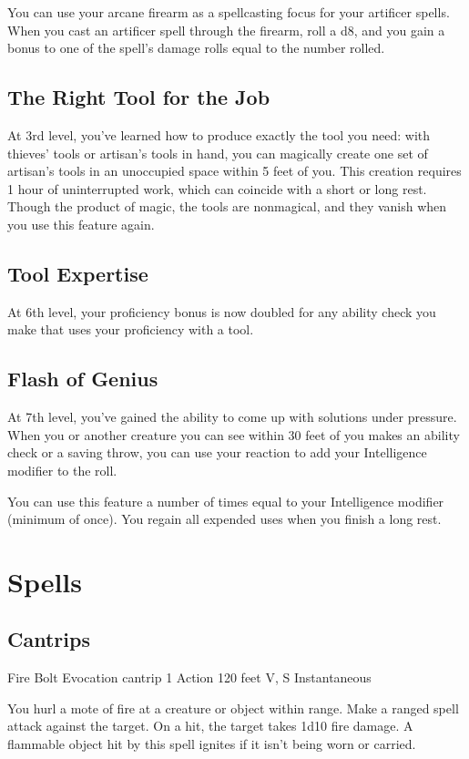 {You can use your arcane firearm as a spellcasting focus for your artificer spells. When you cast an artificer spell through the firearm, roll a d8, and you gain a bonus to one of the spell's damage rolls equal to the number rolled.

\subsection*{The Right Tool for the Job}
At 3rd level, you've learned how to produce exactly the tool you need: with thieves' tools or artisan's tools in hand, you can magically create one set of artisan's tools in an unoccupied space within 5 feet of you. This creation requires 1 hour of uninterrupted work, which can coincide with a short or long rest. Though the product of magic, the tools are nonmagical, and they vanish when you use this feature again.

\subsection*{Tool Expertise}
At 6th level, your proficiency bonus is now doubled for any ability check you make that uses your proficiency with a tool.

\subsection*{Flash of Genius}
At 7th level, you've gained the ability to come up with solutions under pressure. When you or another creature you can see within 30 feet of you makes an ability check or a saving throw, you can use your reaction to add your Intelligence modifier to the roll.

You can use this feature a number of times equal to your Intelligence modifier (minimum of once). You regain all expended uses when you finish a long rest.

\section*{Spells}
\subsection*{Cantrips}

\DndSpellHeader
	{Fire Bolt}
	{Evocation cantrip}
	{1 Action}
	{120 feet}
	{V, S}
	{Instantaneous}

You hurl a mote of fire at a creature or object within range. Make a ranged spell attack against the target. On a hit, the target takes 1d10 fire damage. A flammable object hit by this spell ignites if it isn’t being worn or carried.

}
